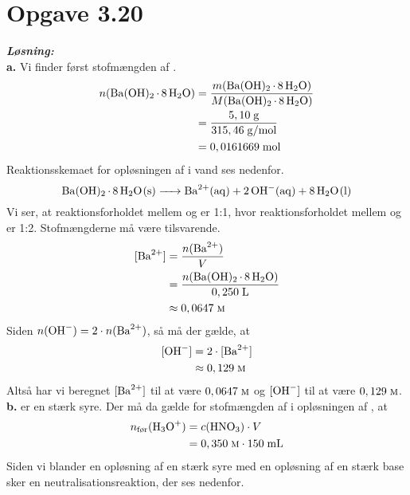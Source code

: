 \documentclass{report}
\newcommand{\sol}{\setlength{\parindent}{0cm}\textbf{\textit{Løsning:}}\setlength{\parindent}{1cm}}
\begin{document}
\section*{Opgave 3.20}
\sol \\
\textbf{a.}
Vi finder først stofmængden af .
\begin{equation*}
\begin{split}
  n(\ce{Ba(OH)2.8H2O})&=\frac{m(\ce{Ba(OH)2.8H2O}) }{M(\ce{Ba(OH)2.8H2O}) }\\ 
  &=\frac{5,10 \;\unit{g} }{315,46 \;\unit{g/mol} }\\ 
  &=0,0161669 \;\unit{mol} 
\end{split}
\end{equation*}
Reaktionsskemaet for opløsningen af  i vand ses nedenfor.
\[
\ce{Ba(OH)2.8H2O(s) -> Ba^2+(aq) + 2OH-(aq) + 8H2O(l)} 
\] 
Vi ser, at reaktionsforholdet mellem  og  er 1:1, hvor reaktionsforholdet mellem  og  er 1:2.
Stofmængderne må være tilsvarende.
\begin{equation*}
\begin{split}
  [\ce{Ba^2+}]&=\frac{n(\ce{Ba^2+} )}{V}\\ 
  &=\frac{n(\ce{Ba(OH)2.8H2O})}{0,250 \;\unit{L} }\\ 
  &\approx 0,0647\;\unit{\textsc{m}} 
\end{split}
\end{equation*}
Siden $n(\ce{OH-} )=2 \cdot n(\ce{Ba^2+}) $, så må der gælde, at 
\begin{equation*}
\begin{split}
  [\ce{OH-} ]&=2 \cdot [\ce{ Ba^2+}]\\ 
  &\approx 0,129 \;\unit{\textsc{m}} 
\end{split}
\end{equation*}
Altså har vi beregnet $[\ce{Ba^2+} ]$ til at være $0,0647 \;\unit{\textsc{m}} $ og $[\ce{OH-} ]$ til at være $0,129 \;\unit{\textsc{m}} $.\\[1ex]
\textbf{b.}
 er en stærk syre.
Der må da gælde for stofmængden af  i opløsningen af , at 
\begin{equation*}
\begin{split}
  n_{\text{før}}(\ce{H3O+} )&=c(\ce{HNO3} ) \cdot V\\ 
  &= 0,350 \;\unit{\textsc{m}} \cdot 150 \;\unit{mL} 
\end{split}
\end{equation*}
Siden vi blander en opløsning af en stærk syre med en opløsning af en stærk base sker en neutralisationsreaktion, der ses nedenfor.
\end{document}
